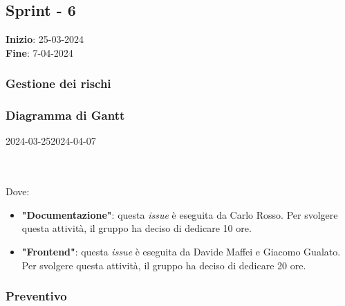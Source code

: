 \subsection{Sprint - 6}
\textbf{Inizio}: 25-03-2024 \\
\textbf{Fine}: 7-04-2024

\subsubsection{Gestione dei rischi}

\subsubsection{Diagramma di Gantt}

\begin{ganttchart}[
		x unit=0.6cm, %
		y unit chart=0.6cm,
		bar/.style={fill=blue!50},
		bar height=0.5,
		time slot format=isodate,
		time slot unit=day,
		vgrid,
		today=2024-03-26,
		today rule/.style={draw=red, ultra thick}
	]{2024-03-25}{2024-04-07}
	 \\
	 \\
	 \\
\end{ganttchart}

Dove:
\begin{itemize}
	\item \textbf{"Documentazione"}: questa \textit{issue} è eseguita da
	      Carlo Rosso. Per svolgere questa attività, il gruppo ha deciso di
	      dedicare 10 ore.

	\item \textbf{"Frontend"}: questa \textit{issue} è eseguita da Davide Maffei
	      e Giacomo Gualato. Per svolgere questa attività, il gruppo ha deciso
	      di dedicare 20 ore.
\end{itemize}

\subsubsection{Preventivo}

